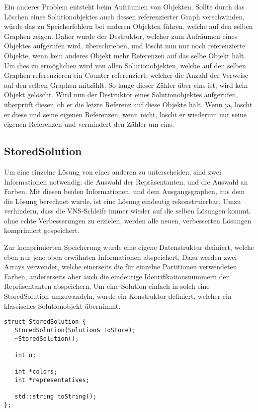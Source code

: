 Ein anderes Problem entsteht beim Aufräumen von Objekten. Sollte durch das Löschen eines Solutionobjektes auch dessen referenzierter Graph verschwinden, würde das zu Speicherfehlern bei anderen Objekten führen, 
welche auf den selben Graphen zeigen. Daher wurde der Destruktor, welcher zum Aufräumen eines Objektes aufgerufen wird, überschrieben, und löscht nun nur noch referenzierte Objekte, wenn kein anderes Objekt
mehr Referenzen auf das selbe Objekt hält. Um dies zu ermöglichen wird von allen Solutionobjekten, welche auf den selben Graphen referenzieren ein Counter referenziert, welcher die Anzahl der
Verweise auf den selben Graphen mitzählt. So lange dieser Zähler über eins ist, wird kein Objekt gelöscht. Wird nun der Destruktor eines Solutionobjektes aufgerufen, überprüft dieser, ob er die letzte
Referenz auf diese Objekte hält. Wenn ja, löscht er diese und seine eigenen Referenzen, wenn nicht, löscht er wiederum nur seine eigenen Referenzen und vermindert den Zähler um eins.

\subsection{StoredSolution}
Um eine einzelne Lösung von einer anderen zu unterscheiden, sind zwei Informationen notwendig: die Auswahl der Repräsentanten, und die Auswahl 
an Farben. Mit diesen beiden Informationen, und dem Ausgangsgraphen, aus dem die Lösung berechnet wurde, ist eine Lösung eindeutig rekonstruierbar.
Umzu verhindern, dass die VNS-Schleife immer wieder auf die selben Lösungen kommt, ohne echte Verbesserungen zu erzielen, werden alle neuen, verbesserten
Lösungen komprimiert gespeichert. 

Zur komprimierten Speicherung wurde eine eigene Datenstruktur definiert, welche eben nur jene oben erwähnten Informationen abspeichert. 
Dazu werden zwei Arrays verwendet, welche einerseits die für einzelne Partitionen verwendeten Farben, andererseits aber auch die 
eindeutige Identifikationsnummern der Repräsentanten abspeichern. Um eine Solution einfach in solch eine StoredSolution umzuwandeln, wurde
ein Konstruktor definiert, welcher ein klassisches Solutionobjekt übernimmt. 

\singlespacing
\begin{lstlisting}[caption={Die Signatur von StoredSolution},label={lst:stored}]
struct StoredSolution {
   StoredSolution(Solution& toStore);
   ~StoredSolution();
   
   int n;
   
   int *colors;
   int *representatives;
   
   std::string toString();
};
\end{lstlisting}


